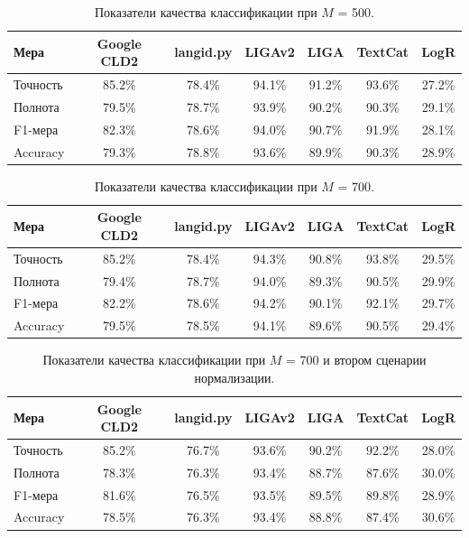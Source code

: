 \documentclass[a4paper, 14pt]{article}
\begin{document}
\begin{center}
\begin{table}[h]
\begin{tabular*}{0.954\textwidth}{| l| *{6}{|c} |}
\hline 
Мера & Google CLD2 & langid.py & LIGAv2 & LIGA & TextCat  & LogR\\
\hline
Точность & 85.2\% & 78.4\% & 94.1\% & 91.2\% & 93.6\% & 27.2\%\\
Полнота & 79.5\% & 78.7\% & 93.9\% & 90.2\% & 90.3\% & 29.1\%\\
F1-мера & 82.3\% & 78.6\% & 94.0\% & 90.7\% & 91.9\% & 28.1\%\\
Accuracy & 79.3\% & 78.8\% & 93.6\% & 89.9\% & 90.3\% & 28.9\%\\
\hline
\end{tabular*}
\caption{Показатели качества классификации при $M$ = 500.}
\label{table:500}
\end{table}
\end{center}

\begin{center}
\begin{table}[h]
\begin{tabular*}{0.954\textwidth}{| l| *{6}{|c} |}
\hline 
Мера & Google CLD2 & langid.py & LIGAv2 & LIGA & TextCat  & LogR\\
\hline
Точность & 85.2\% & 78.4\% & 94.3\% & 90.8\% & 93.8\% & 29.5\%\\
Полнота & 79.4\% & 78.7\% & 94.0\% & 89.3\% & 90.5\% & 29.9\%\\
F1-мера & 82.2\% & 78.6\% & 94.2\% & 90.1\% & 92.1\% & 29.7\%\\
Accuracy & 79.5\% & 78.5\% & 94.1\% & 89.6\% & 90.5\% & 29.4\%\\
\hline
\end{tabular*}
\caption{Показатели качества классификации при $M$ = 700.}
\label{table:700}
\end{table}
\end{center}


\begin{center}
\begin{table}[h]
\begin{tabular*}{0.954\textwidth}{| l| *{6}{|c} |}
\hline 
Мера & Google CLD2 & langid.py & LIGAv2 & LIGA & TextCat  & LogR\\
\hline
Точность & 85.2\% & 76.7\% & 93.6\% & 90.2\% & 92.2\% & 28.0\%\\
Полнота & 78.3\% & 76.3\% & 93.4\% & 88.7\% & 87.6\% & 30.0\%\\
F1-мера & 81.6\% & 76.5\% & 93.5\% & 89.5\% & 89.8\% & 28.9\%\\
Accuracy & 78.5\% & 76.3\% & 93.4\% & 88.8\% & 87.4\% & 30.6\%\\
\hline
\end{tabular*}
\caption{Показатели качества классификации при $M$ = 700 и втором сценарии нормализации.}
\label{table:700_2}
\end{table}
\end{center}
\end{document}
